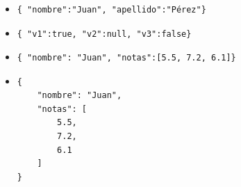 \documentclass[ucs]{beamer}
\begin{document}
\begin{frame}[fragile]
\frametitle{}
\begin{itemize}




\item
  \begin{footnotesize}
  \begin{verbatim}
{ "nombre":"Juan", "apellido":"Pérez"}
  \end{verbatim}
  \end{footnotesize}
\item
  \begin{footnotesize}
  \begin{verbatim}
{ "v1":true, "v2":null, "v3":false}
  \end{verbatim}
  \end{footnotesize}
\item
  \begin{footnotesize}
  \begin{verbatim}
{ "nombre": "Juan", "notas":[5.5, 7.2, 6.1]}
  \end{verbatim}
  \end{footnotesize}
\item
  \begin{footnotesize}
  \begin{verbatim}
{
    "nombre": "Juan", 
    "notas": [
        5.5, 
        7.2, 
        6.1
    ]
}
  \end{verbatim}
  \end{footnotesize}
\end{itemize}

\end{frame}
\end{document}
